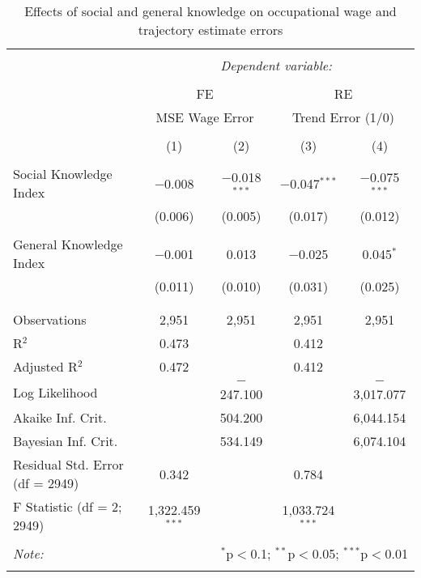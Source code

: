 
\begin{table}[!htbp] \centering 
  \caption{Effects of social and general knowledge on occupational wage and trajectory estimate errors} 
  \label{tab:fe_errors} 
\begin{tabular}{@{\extracolsep{5pt}}lcccc} 
\\[-1.8ex]\hline 
\hline \\[-1.8ex] 
 & \multicolumn{4}{c}{\textit{Dependent variable:}} \\ 
\cline{2-5} 
\\[-1.8ex] & \multicolumn{2}{c}{FE} & \multicolumn{2}{c}{RE} \\ 
 & \multicolumn{2}{c}{MSE Wage Error} & \multicolumn{2}{c}{Trend Error (1/0)} \\ 
\\[-1.8ex] & (1) & (2) & (3) & (4)\\ 
\hline \\[-1.8ex] 
 Social Knowledge Index & $-$0.008 & $-$0.018$^{***}$ & $-$0.047$^{***}$ & $-$0.075$^{***}$ \\ 
  & (0.006) & (0.005) & (0.017) & (0.012) \\ 
  & & & & \\ 
 General Knowledge Index & $-$0.001 & 0.013 & $-$0.025 & 0.045$^{*}$ \\ 
  & (0.011) & (0.010) & (0.031) & (0.025) \\ 
  & & & & \\ 
\hline \\[-1.8ex] 
Observations & 2,951 & 2,951 & 2,951 & 2,951 \\ 
R$^{2}$ & 0.473 &  & 0.412 &  \\ 
Adjusted R$^{2}$ & 0.472 &  & 0.412 &  \\ 
Log Likelihood &  & $-$247.100 &  & $-$3,017.077 \\ 
Akaike Inf. Crit. &  & 504.200 &  & 6,044.154 \\ 
Bayesian Inf. Crit. &  & 534.149 &  & 6,074.104 \\ 
Residual Std. Error (df = 2949) & 0.342 &  & 0.784 &  \\ 
F Statistic (df = 2; 2949) & 1,322.459$^{***}$ &  & 1,033.724$^{***}$ &  \\ 
\hline 
\hline \\[-1.8ex] 
\textit{Note:}  & \multicolumn{4}{r}{$^{*}$p$<$0.1; $^{**}$p$<$0.05; $^{***}$p$<$0.01} \\ 
\normalsize 
\end{tabular} 
\end{table} 
